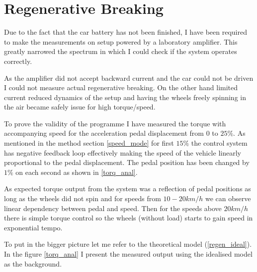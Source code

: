 \section{Regenerative Breaking}
Due to the fact that the car battery has not been finished, I have been required to make the measurements on setup powered by a laboratory amplifier. This greatly narrowed the spectrum in which I could check if the system operates correctly.

As the amplifier did not accept backward current and the car could not be driven I could not measure actual regenerative breaking. On the other hand limited current reduced dynamics of the setup and having the wheels freely spinning in the air became safely issue for high torque/speed.

To prove the validity of the programme I have measured the torque with accompanying speed for the acceleration pedal displacement from $0$ to $25\%$. As mentioned in the method section \ref{speed_mode} for first $15\%$  the control system has negative feedback loop effectively making the speed of the vehicle linearly proportional to the pedal displacement.
The pedal position has been changed by $1\%$ on each second as shown in \ref{torq_anal}. 


As expected torque output from the system was a reflection of pedal positions as long as the wheels did not spin and for speeds from $10-20 km/h$ we can observe linear dependency between pedal and speed. Then for the speeds above $20km/h$ there is simple torque control so the wheels (without load) starts to gain speed in exponential tempo.

To put in the bigger picture let me refer to the theoretical model (\ref{regen_ideal}). In the figure \ref{torq_anal} I present the measured output using the idealised model as the background. 


